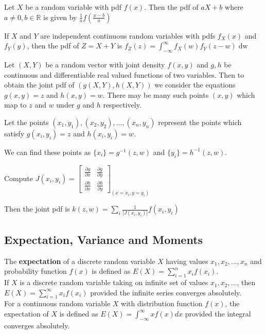 \begin{thm}
    Let $X$ be a random variable with pdf $f(x)$. Then the pdf of $aX+b$ where $a \neq 0, b \in \mathbb{R}$ is given by $\displaystyle \frac{1}{a} f \left (\frac{x-b}{a} \right)$
\end{thm}

\begin{thm}
    If $X$ and $Y$ are independent continuous random variables with pdfs $f_X(x)$ and $f_Y(y)$, then the pdf of $Z = X+Y$ is $f_Z\left (z\right ) = \displaystyle\int_{- \infty}^\infty f_X \left (w\right ) f_Y \left (z - w\right ) \mathop{\mathrm{d} w}$
\end{thm}

\begin{prop}
    Let $(X,Y)$ be a random vector with joint density $f(x,y)$ and $g,h$ be continuous and differentiable real valued functions of two variables. Then to obtain the joint pdf of $(g(X,Y), h(X,Y))$ we consider the equations $g(x,y) = z$ and $h(x,y) = w$. There may be many such points $(x,y)$ which map to $z$ and $w$ under $g$ and $h$ respectively.

    Let the points $(x_1, y_1), (x_2, y_2), ..., (x_n, y_n)$ represent the points which satisfy $g(x_i, y_i) = z$ and $h(x_i, y_i) = w$.

    We can find these points as $\{x_i\} = g^{-1}(z,w)$ and $\{ y_i \} = h^{-1}(z,w)$.

    Compute $J(x_i, y_i) = \begin{bmatrix} \frac{\partial g}{\partial x} & \frac{\partial g}{\partial y} \\ \frac{\partial h}{\partial x} & \frac{\partial h}{\partial y} \end{bmatrix}_{(x = x_i, y = y_i)}$

        Then the joint pdf is $k(z,w) = \displaystyle \sum_i \frac{1}{|J(x_i, y_i)|} f(x_i, y_i)$
\end{prop}

\subsection*{Expectation, Variance and Moments}

\begin{defn}
    The \textbf{expectation} of a discrete random variable $X$ having values $x_1, x_2, ..., x_n$ and probability function $f(x)$ is defined as $E\left (X\right ) = \sum_{i=1}^n x_i f\left (x_i\right )$.
    \\

    If $X$ is a discrete random variable taking on infinite set of values $x_1, x_2, ...$, then $E(X) = \sum_{i=1}^\infty x_i f(x_i)$ provided the infinite series converges absolutely.
    \\

    For a continuous random variable $X$ with distribution function $f(x)$, the expectation of $X$ is defined as $E(X) = \int_{- \infty}^\infty x f(x) dx$ provided the integral converges absolutely.
\end{defn}



